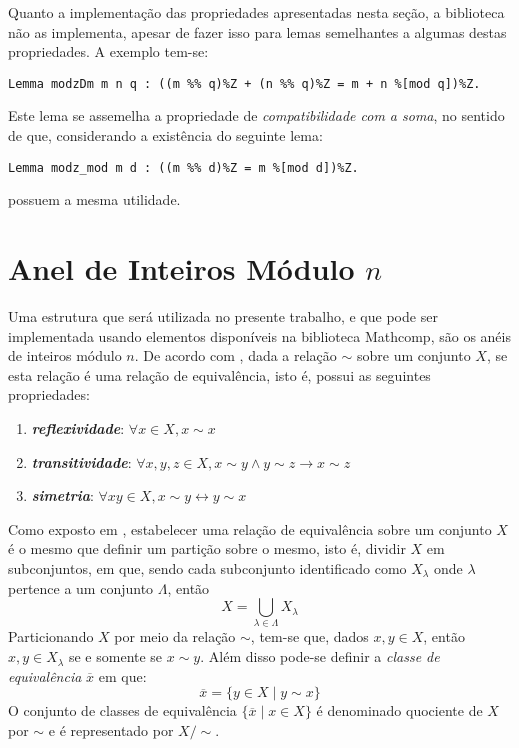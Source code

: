 Quanto a implementação das propriedades apresentadas nesta seção, a biblioteca não as implementa, apesar de fazer isso para lemas semelhantes a algumas destas propriedades. A exemplo tem-se:
    \begin{lstlisting}[language=coq,frame=single,tabsize=1]
Lemma modzDm m n q : ((m %% q)%Z + (n %% q)%Z = m + n %[mod q])%Z.
    \end{lstlisting}
Este lema se assemelha a propriedade de \textit{compatibilidade com a soma}, no sentido de que, considerando a existência do seguinte lema:
    \begin{lstlisting}[language=coq,frame=single,tabsize=1]
Lemma modz_mod m d : ((m %% d)%Z = m %[mod d])%Z.
    \end{lstlisting}
possuem a mesma utilidade. 


\section{Anel de Inteiros Módulo $n$}

Uma estrutura que será utilizada no presente trabalho, e que pode ser implementada usando elementos disponíveis na biblioteca Mathcomp, são os anéis de inteiros módulo $n$. De acordo com \cite[p.40-41]{book:2399854}, dada a relação $\sim$ sobre um conjunto $X$, se esta relação é uma relação de equivalência, isto é, possui as seguintes propriedades:
\begin{enumerate}
    \item \textbf{\textit{reflexividade}}: $\forall x \in X, x \sim x$
    \item \textbf{\textit{transitividade}}: $\forall x, y, z \in X, x \sim y \land y \sim z \rightarrow x \sim z$
    \item \textbf{\textit{simetria}}: $\forall x y \in X, x \sim y \leftrightarrow y \sim x$
\end{enumerate}
Como exposto em \cite[p.~40]{book:2399854}, estabelecer uma relação de equivalência sobre um conjunto $X$ é o mesmo que definir um partição sobre o mesmo, isto é, dividir $X$ em subconjuntos, em que, sendo cada subconjunto identificado como $X_\lambda$ onde $\lambda$ pertence a um conjunto $\Lambda$, então
\begin{equation*}
    X = \bigcup_{\lambda \in \Lambda} X_{\lambda}
\end{equation*}
Particionando $X$ por meio da relação $\sim$, tem-se que, dados $x, y \in X$, então $x, y \in X_\lambda$ se e somente se $x \sim y$. Além disso pode-se definir a \textit{classe de equivalência} $\overline{x}$ em que:
\begin{equation*}
    \overline{x} = \{y \in X \mid y \sim x \}
\end{equation*}
O conjunto de classes de equivalência $\{\overline{x} \mid x \in X\}$ é denominado quociente de $X$ por $\sim$ e é representado por $X/\sim$.

